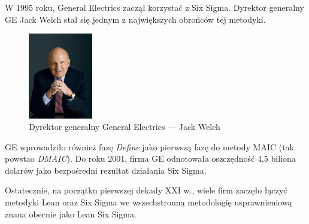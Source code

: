 W 1995 roku, General Electrics zaczął korzystać z Six Sigma. Dyrektor generalny
GE Jack Welch stał się jednym z największych obrońców tej metodyki.
\begin{figure}[!htp]
	\centering
	\includegraphics[width=0.25\textwidth]{img/welch}
	\caption{Dyrektor generalny General Electrics --- Jack Welch}
\end{figure}
GE wprowadziło również fazę \emph{Define} jako pierwszą fazę do metody MAIC (tak powstao \textit{DMAIC}). Do roku 
2001, firma GE odnotowała oszczędność 4,5 biliona dolarów jako bezpośredni
rezultat działania Six Sigma.

Ostatecznie, na początku pierwszej dekady XXI w., wiele firm zaczęło łączyć metodyki Lean oraz Six Sigma we wszechstronną metodologię usprawnieniową znana obecnie jako Lean Six Sigma.
